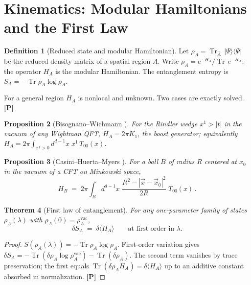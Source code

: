 \documentclass[11pt]{article}
\newtheorem{theorem}{Theorem}[section]
\newtheorem{proposition}[theorem]{Proposition}
\theoremstyle{definition}
\newtheorem{definition}[theorem]{Definition}
\newcommand{\pP}{\textbf{[P]}}
\newcommand{\Tr}{\operatorname{Tr}}
\begin{document}
\section{Kinematics: Modular Hamiltonians and the First Law}

\begin{definition}[Reduced state and modular Hamiltonian]
Let $\rho_A=\Tr_{\bar A}\,|\Psi\rangle\langle\Psi|$ be the reduced density
matrix of a spatial region $A$. Write $\rho_A=e^{-H_A}/\Tr\,e^{-H_A}$; the
operator $H_A$ is the modular Hamiltonian. The entanglement entropy is
$S_A=-\Tr\rho_A\log\rho_A$.
\end{definition}

For a general region $H_A$ is nonlocal and unknown. Two cases are exactly
solved. \pP{}

\begin{proposition}[Bisognano--Wichmann \cite{BisognanoWichmann1976}]
For the Rindler wedge $x^1>|t|$ in the vacuum of any Wightman QFT,
$H_A=2\pi K_1$, the boost generator; equivalently
$H_A = 2\pi\!\int_{x^1>0} d^{d-1}x\; x^1\, T_{00}(x)$.
\end{proposition}

\begin{proposition}[Casini--Huerta--Myers \cite{CHM2011}]
For a ball $B$ of radius $R$ centered at $x_0$ in the vacuum of a CFT on
Minkowski space,
\begin{equation}
H_B \;=\; 2\pi\!\int_B d^{d-1}x\;\frac{R^2-|\vec x-\vec x_0|^2}{2R}\;
T_{00}(x)\,.
\label{eq:CHM}
\end{equation}
\end{proposition}

\begin{theorem}[First law of entanglement]
For any one-parameter family of states $\rho_A(\lambda)$ with
$\rho_A(0)=\rho_A^{\mathrm{vac}}$,
\begin{equation}
\delta S_A \;=\; \delta\langle H_A\rangle
\qquad\text{at first order in }\lambda .
\label{eq:firstlaw}
\end{equation}
\end{theorem}

\begin{proof}
$S(\rho_A(\lambda)) = -\Tr\rho_A\log\rho_A$. First-order variation gives
$\delta S_A = -\Tr(\delta\rho_A\log\rho_A^{\mathrm{vac}})
-\Tr(\delta\rho_A)$. The second term vanishes by trace preservation; the
first equals $\Tr(\delta\rho_A H_A)=\delta\langle H_A\rangle$ up to an additive
constant absorbed in normalization. \pP{}
\end{proof}
\end{document}
